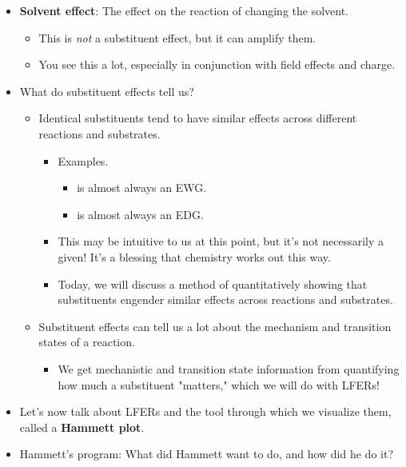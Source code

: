 \documentclass[../notes.tex]{subfiles}
\begin{document}
\begin{itemize}
\begin{itemize}
    \end{itemize}
    \item \textbf{Solvent effect}: The effect on the reaction of changing the solvent.
    \begin{itemize}
        \item This is \emph{not} a substituent effect, but it can amplify them.
        \item You see this a lot, especially in conjunction with field effects and charge.
    \end{itemize}
    \item What do substituent effects tell us?
    \begin{itemize}
        \item Identical substituents tend to have similar effects across different reactions and substrates.
        \begin{itemize}
            \item Examples.
            \begin{itemize}
                \item {} is almost always an EWG.
                \item {} is almost always an EDG.
            \end{itemize}
            \item This may be intuitive to us at this point, but it's not necessarily a given! It's a blessing that chemistry works out this way.
            \item Today, we will discuss a method of quantitatively showing that substituents engender similar effects across reactions and substrates.
        \end{itemize}
        \item Substituent effects can tell us a lot about the mechanism and transition states of a reaction.
        \begin{itemize}
            \item We get mechanistic and transition state information from quantifying how much a substituent "matters," which we will do with LFERs!
        \end{itemize}
    \end{itemize}
    \item Let's now talk about LFERs and the tool through which we visualize them, called a \textbf{Hammett plot}.
    \item Hammett's program: What did Hammett want to do, and how did he do it?
    \begin{itemize}

\end{itemize}
\end{itemize}
\end{document}
